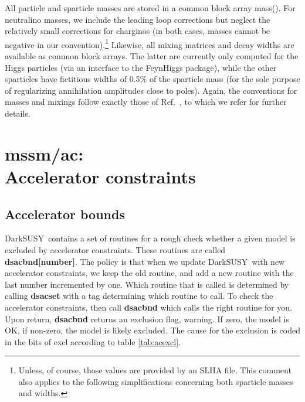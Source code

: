 \documentclass[a4paper,10pt,oneside]{book}
\newcommand{\code}[1]{\ft{#1}}
\newcommand{\codeb}[1]{\ftb{#1}}
\newcommand{\ds}{{\sffamily DarkSUSY}}
\newcommand{\ft}[1]{\textsf{#1}}
\newcommand{\ftb}[1]{{\bfseries \sffamily #1}}
\begin{document}
 All particle and sparticle masses are stored in a common block array \code{mass()}. For 
 neutralino masses, we include the leading loop corrections \cite{Drees:1996pk,
 Pierce:1993gj,Lahanas:1993ib}
 but neglect the relatively small corrections for charginos \cite{Drees:1996pk} 
 (in both cases, masses cannot be negative in our convention).\footnote{
 Unless, of course, those values are provided by an SLHA file. This comment also applies to the following 
 simplifications concerning both sparticle masses and widths.
 }
 Likewise, all mixing matrices and decay widths are available as common block arrays. 
 The latter are currently only computed for the Higgs particles (via an interface to the
 \code{FeynHiggs} \cite{Heinemeyer:1998yj,feynhiggs_www,Heinemeyer:1998jw,
 Heinemeyer:1998np,Heinemeyer:1999be} package),
 while the other sparticles have fictitious widths of 0.5\% of the sparticle mass (for the 
 sole purpose of regularizing annihilation amplitudes close to poles). Again, the 
 conventions for masses and mixings follow exactly those of Ref.~\cite{ds4}, to which we 
 refer for further details.
\section[mssm/ac: Accelerator constraints]{\codeb{mssm/ac}:\\ Accelerator constraints}
\label{sec:src_models/mssm/ac}


\subsection{Accelerator bounds}

\ds\ contains a set of routines for a rough check whether a given model is excluded by
accelerator constraints. These routines are called \ftb{dsacbnd[number]}. The
policy is that when we update \ds\ with new accelerator constraints, we keep
the old routine, and add a new routine with the last number incremented by one.
Which routine that is called is determined by calling \ftb{dsacset} with a
tag determining which routine to call. To check the accelerator constraints, 
then call \ftb{dsacbnd} which calls the right routine for you. Upon return,
\ftb{dsacbnd} returns an exclusion flag, \code{warning}. If zero, the model
is OK, if non-zero, the model is likely excluded. The cause for the exclusion is coded
in the bits of \code{excl} according to table \ref{tab:acexcl}. 
\end{document}
